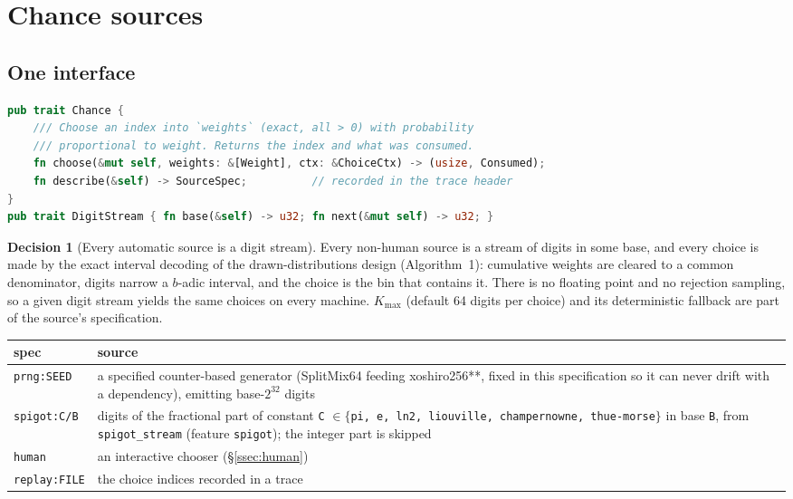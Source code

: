\documentclass[11pt,a4paper]{article}
\theoremstyle{definition}
\newtheorem{decision}[requirement]{Decision}
\theoremstyle{remark}
\begin{document}
\section{Chance sources}\label{sec:chance}

\subsection{One interface}

\begin{lstlisting}[language=Rust]
pub trait Chance {
    /// Choose an index into `weights` (exact, all > 0) with probability
    /// proportional to weight. Returns the index and what was consumed.
    fn choose(&mut self, weights: &[Weight], ctx: &ChoiceCtx) -> (usize, Consumed);
    fn describe(&self) -> SourceSpec;          // recorded in the trace header
}
pub trait DigitStream { fn base(&self) -> u32; fn next(&mut self) -> u32; }
\end{lstlisting}

\begin{decision}[Every automatic source is a digit stream]\label{dec:digits}
Every non-human source is a stream of digits in some base, and every choice is
made by the exact interval decoding of the drawn-distributions design
(Algorithm~1): cumulative weights are cleared to a common denominator, digits
narrow a $b$-adic interval, and the choice is the bin that contains it. There is
no floating point and no rejection sampling, so a given digit stream yields the
same choices on every machine. $K_{\max}$ (default 64 digits per choice) and its
deterministic fallback are part of the source's specification.
\end{decision}

\begin{center}
\small
\begin{tabular}{@{}l>{\raggedright\arraybackslash}p{9.2cm}@{}}
\toprule
spec & source \\
\midrule
\texttt{prng:SEED} & a specified counter-based generator (SplitMix64 feeding
  xoshiro256**, fixed in this specification so it can never drift with a
  dependency), emitting base-$2^{32}$ digits \\
\texttt{spigot:C/B} & digits of the fractional part of constant \texttt{C}
  $\in\{$\texttt{pi, e, ln2, liouville, champernowne, thue-morse}$\}$ in base
  \texttt{B}, from \texttt{spigot\_stream} (feature \texttt{spigot}); the
  integer part is skipped \\
\texttt{human} & an interactive chooser (\S\ref{ssec:human}) \\
\texttt{replay:FILE} & the choice indices recorded in a trace \\
\bottomrule
\end{tabular}
\end{center}
\end{document}
